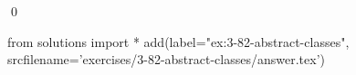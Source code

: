 
\begin{ex}
  \label{ex:3-82-abstract-classes}
  
  \qed
\end{ex}
\begin{python0}
from solutions import *
add(label="ex:3-82-abstract-classes",
    srcfilename='exercises/3-82-abstract-classes/answer.tex')
\end{python0}
